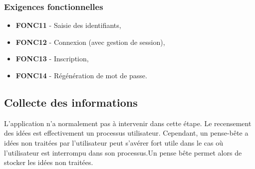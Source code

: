\subsubsection{Exigences fonctionnelles}


\begin{itemize}	\renewcommand{\labelitemi}{}
	\item \textbf{FONC11} - Saisie des identifiants,
	\item \textbf{FONC12} - Connexion (avec gestion de session),
	\item \textbf{FONC13} - Inscription,
	\item \textbf{FONC14} - Régénération de mot de passe.\\
\end{itemize}

\subsection{Collecte des informations}

L'application n'a normalement pas à intervenir dans cette étape. Le recensement des idées est effectivement un processus utilisateur. Cependant, un pense-bête a idées non traitées par l'utilisateur peut s'avérer fort utile dans le cas où l'utilisateur est interrompu dans son processus.Un pense bête permet alors de stocker les idées non traitées.

